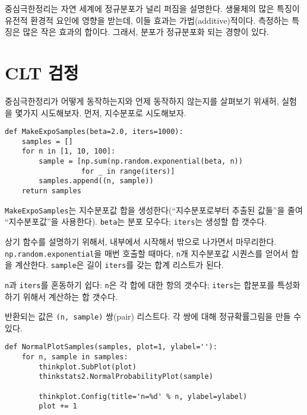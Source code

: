 중심극한정리는 자연 세계에 정규분포가 널리 퍼짐을 설명한다.
생물체의 많은 특징이 유전적 환경적 요인에 영향을 받는데, 이들 효과는 가법(additive)적이다. 측정하는 특징은 많은 작은 효과의 합이다. 그래서, 분포가 정규분포화 되는 경향이 있다.



\section{CLT 검정}

중심극한정리가 어떻게 동작하는지와 언제 동작하지 않는지를 살펴보기 위새허, 실험을 몇가지 시도해보자. 먼저, 지수분포로 시도해보자.

\begin{verbatim}
def MakeExpoSamples(beta=2.0, iters=1000):
    samples = []
    for n in [1, 10, 100]:
        sample = [np.sum(np.random.exponential(beta, n))
                  for _ in range(iters)]
        samples.append((n, sample))
    return samples
\end{verbatim}


{\tt MakeExpoSamples}는 지수분포값 합을 생성한다(``지수분포로부터 추출된 값들''을 줄여 ``지수분포값''을 사용한다).
{\tt beta}는 분포 모수다; {\tt iters}는 생성할 합 갯수다.

상기 함수를 설명하기 위해서, 내부에서 시작해서 밖으로 나가면서 마무리한다.
{\tt np.random.exponential}을 매번 호출할 때마다, {\tt n}개 지수분포값 시퀀스를 얻어서 합을 계산한다. {\tt sample}은 길이 {\tt iters}를 갖는 합계 리스트가 된다.

{\tt n}과 {\tt iters}를 혼동하기 쉽다: {\tt n}은 각 합에 대한 항의 갯수다; {\tt iters}는 합분포를 특성화하기 위해서 계산하는 합 갯수다.

반환되는 값은 {\tt (n, sample)} 쌍(pair) 리스트다. 각 쌍에 대해 정규확률그림을 만들 수 있다.

\begin{verbatim}
def NormalPlotSamples(samples, plot=1, ylabel=''):
    for n, sample in samples:
        thinkplot.SubPlot(plot)
        thinkstats2.NormalProbabilityPlot(sample)

        thinkplot.Config(title='n=%d' % n, ylabel=ylabel)
        plot += 1
\end{verbatim}

